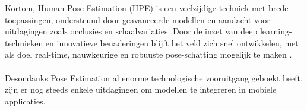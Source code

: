 \medskip

Kortom, Human Pose Estimation (HPE) is een veelzijdige techniek met brede toepassingen, ondersteund door geavanceerde modellen en aandacht voor uitdagingen zoals occlusies en schaalvariaties. 
Door de inzet van deep learning-technieken en innovatieve benaderingen blijft het veld zich snel ontwikkelen, met als doel real-time, nauwkeurige en robuuste pose-schatting mogelijk te maken \autocite{DongEtAl2024}.


\paragraph{}%
\label{par:uitdagingen-van-pose-estimation-op-mobiele-apparaten}

Desondanks Pose Estimation al enorme technologische vooruitgang geboekt heeft, zijn er nog steeds enkele uitdagingen om modellen te integreren in mobiele applicaties.

